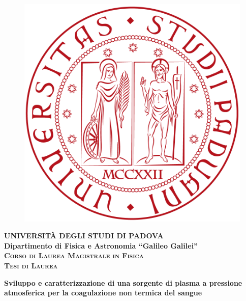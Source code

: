 \documentclass[twoside,openright,titlepage,headings,footinclude=true,cleardoublepage=empty,BCOR=5mm,11pt,a4paper,english]{book}
\begin{document}
\begin{titlepage}
\vspace{5mm}
\begin{figure}[hbtp]
\centering
\includegraphics[scale=.13]{Images/UnipdLogo.png}
\end{figure}
\vspace{5mm}
\begin{center}
{{\huge{\textsc{\bf UNIVERSIT\`A DEGLI STUDI DI PADOVA}}}\\}
\vspace{5mm}
{\Large{\bf Dipartimento di Fisica e Astronomia ``Galileo Galilei''}} \\
\vspace{5mm}
{\Large{\textsc{\bf Corso di Laurea Magistrale in Fisica}}}\\
\vspace{15mm}
{\Large{\textsc{\bf Tesi di Laurea}}}\\
\vspace{15mm}
\begin{spacing}{3}
{\LARGE \textbf{Sviluppo e caratterizzazione di una sorgente di plasma a pressione atmosferica per la coagulazione non termica del sangue​}}\\
\end{spacing}
\vspace{5mm}
\end{center}


\end{titlepage}
\end{document}
